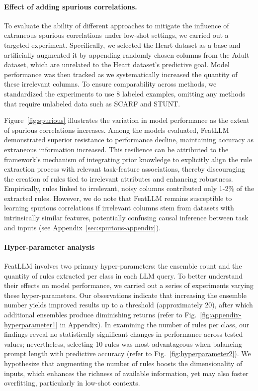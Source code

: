 \paragraph{Effect of adding spurious correlations.} To evaluate the ability of different approaches to mitigate the influence of extraneous spurious correlations under low-shot settings, we carried out a targeted experiment. Specifically, we selected the Heart dataset as a base and artificially augmented it by appending randomly chosen columns from the Adult dataset, which are unrelated to the Heart dataset's predictive goal. Model performance was then tracked as we systematically increased the quantity of these irrelevant columns. To ensure comparability across methods, we standardized the experiments to use 8 labeled examples, omitting any methods that require unlabeled data such as SCARF and STUNT.

Figure~\ref{fig:spurious} illustrates the variation in model performance as the extent of spurious correlations increases. Among the models evaluated, \textsf{FeatLLM} demonstrated superior resistance to performance decline, maintaining accuracy as extraneous information increased. This resilience can be attributed to the framework's mechanism of integrating prior knowledge to explicitly align the rule extraction process with relevant task-feature associations, thereby discouraging the creation of rules tied to irrelevant attributes and enhancing robustness. Empirically, rules linked to irrelevant, noisy columns contributed only 1-2\% of the extracted rules. However, we do note that \textsf{FeatLLM} remains susceptible to learning spurious correlations if irrelevant columns stem from datasets with intrinsically similar features, potentially confusing causal inference between task and inputs (see Appendix~\ref{sec:spurious-appendix}).

\vspace*{-0.12in}
\paragraph{Hyper-parameter analysis}
\textsf{FeatLLM} involves two primary hyper-parameters: the ensemble count and the quantity of rules extracted per class in each LLM query. To better understand their effects on model performance, we carried out a series of experiments varying these hyper-parameters. Our observations indicate that increasing the ensemble number yields improved results up to a threshold (approximately 20), after which additional ensembles produce diminishing returns (refer to Fig.~\ref{fig:appendix-hyperparameter1} in Appendix). In examining the number of rules per class, our findings reveal no statistically significant changes in performance across tested values; nevertheless, selecting 10 rules was most advantageous when balancing prompt length with predictive accuracy (refer to Fig.~\ref{fig:hyperparameter2}). We hypothesize that augmenting the number of rules boosts the dimensionality of inputs, which enhances the richness of available information, yet may also foster overfitting, particularly in low-shot contexts.

